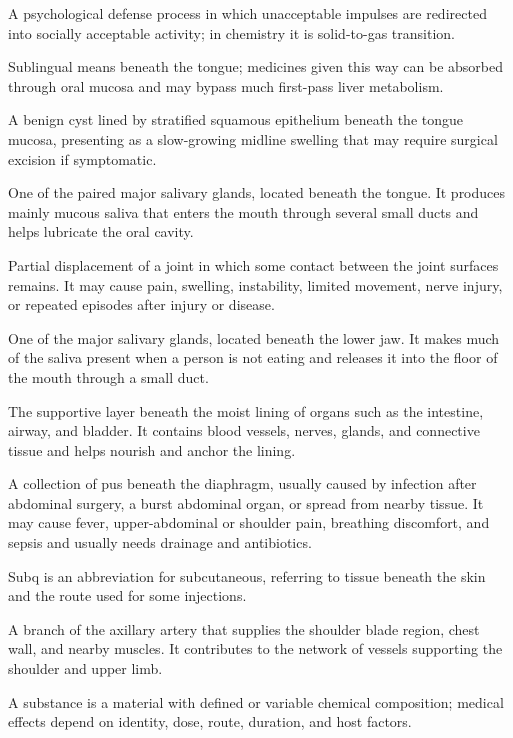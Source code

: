  A psychological defense process in which unacceptable impulses are redirected into socially acceptable activity; in chemistry it is solid-to-gas transition.

 Sublingual means beneath the tongue; medicines given this way can be absorbed through oral mucosa and may bypass much first-pass liver metabolism.

 A benign cyst lined by stratified squamous epithelium beneath the tongue mucosa,
presenting as a slow-growing midline swelling that may require surgical excision if
symptomatic.

 One of the paired major salivary glands, located beneath the tongue. It produces mainly mucous saliva that enters the
mouth through several small ducts and helps lubricate the oral cavity.

 Partial displacement of a joint in which some contact between the joint surfaces remains. It may cause pain, swelling, instability, limited movement, nerve injury, or repeated episodes after injury or disease.

 One of the major salivary glands, located beneath the lower jaw. It makes much of the saliva present when a person is not eating and releases it into the floor of the mouth through a small duct.

 The supportive layer beneath the moist lining of organs such as the intestine, airway, and bladder. It contains blood vessels, nerves, glands, and connective tissue and helps nourish and anchor the lining.

 A collection of pus beneath the diaphragm, usually caused by infection after abdominal surgery, a burst abdominal organ, or spread from nearby tissue. It may cause fever, upper-abdominal or shoulder pain, breathing discomfort, and sepsis and usually needs drainage and antibiotics.

 Subq is an abbreviation for subcutaneous, referring to tissue beneath the skin and the route used for some injections.

 A branch of the axillary artery that supplies the shoulder blade region, chest wall, and nearby muscles. It contributes to the network of vessels supporting the shoulder and upper limb.

 A substance is a material with defined or variable chemical composition; medical effects depend on identity, dose, route, duration, and host factors.

